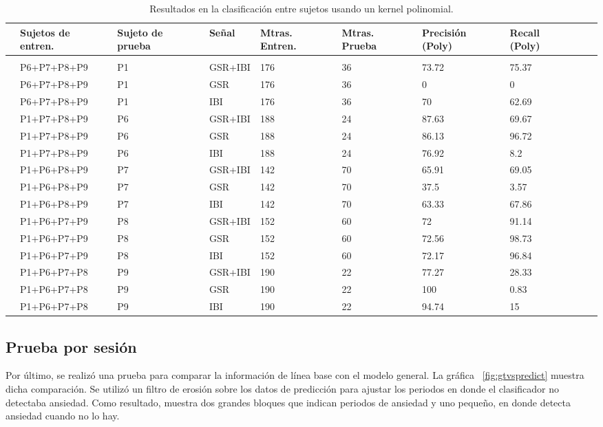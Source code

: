 \begin{table}[h!]
        \footnotesize
        \centering
        \caption{Resultados en la clasificaci\'on entre sujetos usando un kernel polinomial.}
\label{table:resultsCross}
        \begin{tabular}{m{.2cm}m{2.5cm}m{1.2cm}m{1.2cm}m{1.2cm}m{1.2cm}m{1.2cm}m{1.2cm}m{1.2cm}m{1.2cm}}
                \hline\noalign{\smallskip}
    &\textbf{Sujetos de entren.}&\textbf{Sujeto de prueba}&\textbf{Se\~nal} &\textbf{Mtras. Entren.}&\textbf{Mtras. Prueba}&\textbf{Precisi\'on (Poly)}& \textbf{Recall (Poly)}\\
	\hline                
 \\\noalign{\smallskip}
&P6+P7+P8+P9&P1&GSR+IBI&176&36&73.72&75.37\\
&P6+P7+P8+P9&P1&GSR&176&36&0&0\\
&P6+P7+P8+P9&P1&IBI&176&36&70&62.69\\
&P1+P7+P8+P9&P6&GSR+IBI&188&24&87.63&69.67\\
&P1+P7+P8+P9&P6&GSR&188&24&86.13&96.72\\
&P1+P7+P8+P9&P6&IBI&188&24&76.92&8.2\\
&P1+P6+P8+P9&P7&GSR+IBI&142&70&65.91&69.05\\
&P1+P6+P8+P9&P7&GSR&142&70&37.5&3.57\\
&P1+P6+P8+P9&P7&IBI&142&70&63.33&67.86\\
&P1+P6+P7+P9&P8&GSR+IBI&152&60&72&91.14\\
&P1+P6+P7+P9&P8&GSR&152&60&72.56&98.73\\
&P1+P6+P7+P9&P8&IBI&152&60&72.17&96.84\\
&P1+P6+P7+P8&P9&GSR+IBI&190&22&77.27&28.33\\
&P1+P6+P7+P8&P9&GSR&190&22&100&0.83\\
&P1+P6+P7+P8&P9&IBI&190&22&94.74&15\\
    \end{tabular}
\end{table}
\newpage
\subsection{Prueba por sesi\'on}
Por \'ultimo, se realiz\'o una prueba para comparar la informaci\'on de l\'inea base con el modelo general. La gr\'afica ~\ref{fig:gtvspredict} muestra dicha comparaci\'on. Se utiliz\'o un filtro de erosi\'on sobre los datos de predicci\'on para ajustar los periodos en donde el clasificador no detectaba ansiedad. Como resultado, muestra dos grandes bloques que indican periodos de ansiedad y uno peque\~no, en donde detecta ansiedad cuando no lo hay.

